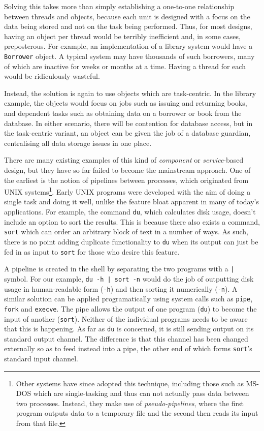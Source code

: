 Solving this takes more than simply establishing a one-to-one
relationship between threads and objects, because each unit is
designed with a focus on the data being stored and not on the task
being performed.  Thus, for most designs, having an object per thread
would be terribly inefficient and, in some cases, preposterous.  For
example, an implementation of a library system would have a
\texttt{Borrower} object.  A typical system may have thousands of such
borrowers, many of which are inactive for weeks or months at a time.
Having a thread for each would be ridiculously wasteful.

Instead, the solution is again to use objects which are task-centric.
In the library example, the objects would focus on jobs such as
issuing and returning books, and dependent tasks such as obtaining
data on a borrower or book from the database.  In either scenario,
there will be contention for database access, but in the task-centric
variant, an object can be given the job of a database guardian,
centralising all data storage issues in one place.

There are many existing examples of this kind of \emph{component} or
\emph{service}-based design, but they have so far failed to become the
mainstream approach.  One of the earliest is the notion of pipelines
between processes, which originated from UNIX systems\footnote{Other
  systems have since adopted this technique, including those such as
  MS-DOS which are single-tasking and thus can not actually pass data
  between two processes.  Instead, they make use of
  \emph{pseudo-pipelines}, where the first program outputs data to a
  temporary file and the second then reads its input from that file.}.
Early UNIX programs were developed with the aim of doing a single task
and doing it well, unlike the feature bloat apparent in many of
today's applications.  For example, the command \texttt{du}, which
calculates disk usage, doesn't include an option to sort the results.
This is because there also exists a command, \texttt{sort} which can
order an arbitrary block of text in a number of ways.  As such, there
is no point adding duplicate functionality to \texttt{du} when its
output can just be fed in as input to \texttt{sort} for those who
desire this feature.

A pipeline is created in the shell by separating the two programs with
a \texttt{|} symbol.  For our example, \texttt{du -h | sort -n} would
do the job of outputting disk usage in human-readable form
(\texttt{-h}) and then sorting it numerically (\texttt{-n}).  A
similar solution can be applied programatically using system calls
such as \texttt{pipe}, \texttt{fork} and \texttt{execve}.  The pipe
allows the output of one program (\texttt{du}) to become the input of
another (\texttt{sort}).  Neither of the individual programs needs to
be aware that this is happening.  As far as \texttt{du} is concerned,
it is still sending output on its standard output channel.  The
difference is that this channel has been changed externally so as to
feed instead into a pipe, the other end of which forms \texttt{sort}'s
standard input channel.


